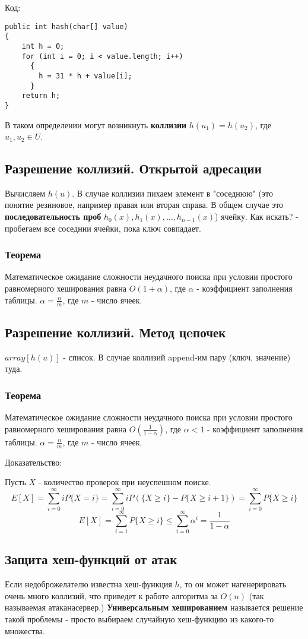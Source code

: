 Код:
\begin{verbatim}
public int hash(char[] value) 
{
    int h = 0;
    for (int i = 0; i < value.length; i++) 
      {
        h = 31 * h + value[i];
      }
    return h;
}
\end{verbatim}

В таком определении могут возникнуть {\bf коллизии} $h(u_1) = h(u_2)$, где $u_1, u_2 \in U$.

\subsection*{Разрешение коллизий. Открытой адресации}
Вычисляем $h(u)$. В случае коллизии пихаем элемент в "соседнюю" (это понятие резиновое, например правая или вторая справа. В общем случае это {\bf последовательность проб} $h_0(x), h_1(x), …, h_{n-1}(x)$) ячейку.
Как искать? - пробегаем все соседнии ячейки, пока ключ совпадает.

\subsubsection*{Теорема}
Математическое ожидание сложности неудачного поиска
при условии простого равномерного хеширования равна
$O(1 + \alpha)$, где $\alpha$ - коэффициент заполнения таблицы.
$\alpha = \frac{n}{m}$, где $m$ - число ячеек. 

\subsection*{Разрешение коллизий. Метод цeпочек}
$array[h(u)]$ - список. В случае коллизий append-им пару (ключ, значение) туда.


\subsubsection*{Теорема}
Математическое ожидание сложности неудачного поиска
при условии простого равномерного хеширования равна
$O(\frac{1}{1-\alpha})$, где $\alpha < 1$ - коэффициент заполнения таблицы.
$\alpha = \frac{n}{m}$, где $m$ - число ячеек. 

Доказательство:

Пусть $X$ - количество проверок при неуспешном поиске.
$$E[X] = \sum\limits_{i=0}^{\infty}iP\{X = i\} = \sum\limits_{i=0}^{\infty}iP(\{X\ge i\} - P\{X\ge i+1\}) = \sum\limits_{i=0}^{\infty}P\{X \ge i\}$$
$$E[X] = \sum\limits_{i=1}^{\infty}P\{X \ge i\}\le\sum\limits_{i=0}^{\infty}\alpha^i = \frac{1}{1-\alpha}$$ 

\subsection*{Защита хеш-функций от атак}
Если недоброжелателю известна хеш-функция $h$, то он может нагенерировать очень много коллизий, что приведет к работе алгоритма за $O(n)$ (так называемая $атака на сервер.$)
{\bf Универсальным хешированием} называется решение такой проблемы - просто выбираем случайную хеш-функцию из какого-то множества.
